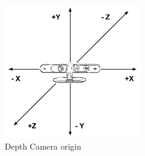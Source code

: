 \begin{figure}
	[h] \centering 
	\includegraphics[height=6cm]{figures/content/xtion-origin.jpg} \caption{Depth Camera origin} \label{fg:xtion:origin} 
\end{figure}

